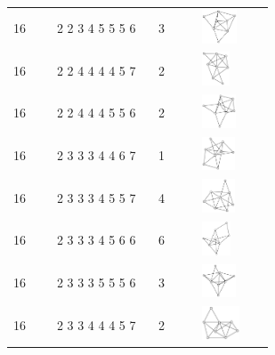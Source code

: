 \begin{table}[h!]
\begin{tabular}{m{0.15\linewidth} m{0.35\linewidth} m{0.15\linewidth} m{0.25\linewidth}}
16 & 2 2 3 4 5 5 5 6 & 3 & \includegraphics[height=1cm]{15-universal-graphs/img/degree-sequences-example-graphs/graph-4-8-135}\\
16 & 2 2 4 4 4 4 5 7 & 2 & \includegraphics[height=1cm]{15-universal-graphs/img/degree-sequences-example-graphs/graph-4-8-136}\\
16 & 2 2 4 4 4 5 5 6 & 2 & \includegraphics[height=1cm]{15-universal-graphs/img/degree-sequences-example-graphs/graph-4-8-137}\\
16 & 2 3 3 3 4 4 6 7 & 1 & \includegraphics[height=1cm]{15-universal-graphs/img/degree-sequences-example-graphs/graph-4-8-138}\\
16 & 2 3 3 3 4 5 5 7 & 4 & \includegraphics[height=1cm]{15-universal-graphs/img/degree-sequences-example-graphs/graph-4-8-139}\\
16 & 2 3 3 3 4 5 6 6 & 6 & \includegraphics[height=1cm]{15-universal-graphs/img/degree-sequences-example-graphs/graph-4-8-140}\\
16 & 2 3 3 3 5 5 5 6 & 3 & \includegraphics[height=1cm]{15-universal-graphs/img/degree-sequences-example-graphs/graph-4-8-141}\\
16 & 2 3 3 4 4 4 5 7 & 2 & \includegraphics[height=1cm]{15-universal-graphs/img/degree-sequences-example-graphs/graph-4-8-142}\\

\end{tabular}
\end{table}
